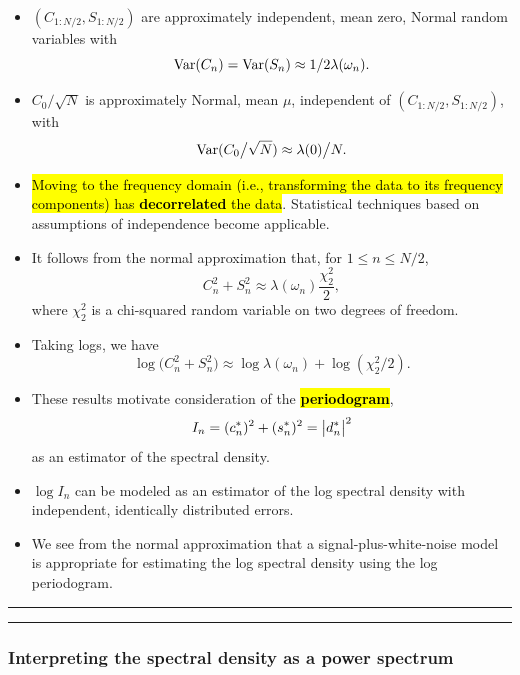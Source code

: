 \documentclass[]{article}
\begin{document}
\begin{itemize}
\item
  \((C_{1:N/2},S_{1:N/2})\) are approximately independent, mean zero,
  Normal random variables with
  \[ \mathrm{Var}(C_n) = \mathrm{Var}(S_n) \approx 1/2 \lambda(\omega_n).\]
\item
  \(C_0\big/ \sqrt{N}\) is approximately Normal, mean \(\mu\),
  independent of \((C_{1:N/2},S_{1:N/2})\), with
  \[\mathrm{Var}(C_0\big/ \sqrt{N}) \approx \lambda(0)\big/ N.\]
\item
  \hl{Moving to the frequency domain (i.e., transforming the data to its
  frequency components) has \textbf{decorrelated} the data}. Statistical
  techniques based on assumptions of independence become applicable.
  
  
\item
  It follows from the normal approximation that, for \(1\le n\le N/2\),
  \[ C_n^2 + S_n^2 \approx \lambda(\omega_n) \frac{\chi^2_2}{2},\] where
  \(\chi^2_2\) is a chi-squared random variable on two degrees of
  freedom.
\item
  Taking logs, we have
  \[ \log\big(C_n^2 + S_n^2 \big) \approx \log \lambda(\omega_n) + \log(\chi^2_2/2).\]
\item
  These results motivate consideration of the \hl{\textbf{periodogram}},
  \[ I_n = (c_n^*)^2 + (s_n^*)^2 = \big|  d_n^*\big|^2\]
  as an estimator of the spectral density.
\item
  \(\log I_n\) can be modeled as an estimator of the log spectral
  density with independent, identically distributed errors.
\item
  We see from the normal approximation that a signal-plus-white-noise
  model is appropriate for estimating the log spectral density using the
  log periodogram.
\end{itemize}

\begin{center}\rule{0.5\linewidth}{\linethickness}\end{center}

\begin{center}\rule{0.5\linewidth}{\linethickness}\end{center}

\subsubsection{Interpreting the spectral density as a power
spectrum}\label{interpreting-the-spectral-density-as-a-power-spectrum}
\end{document}
